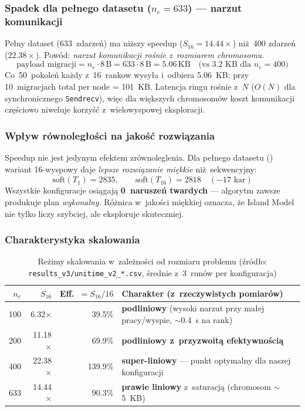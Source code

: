 \documentclass{common/sprawozdanie-agh}
\begin{document}
\subsubsection*{Spadek dla pełnego datasetu ($n_e=633$) --- narzut komunikacji}

Pełny dataset  (633~zdarzeń) ma niższy speedup ($S_{16}=14.44\times$) niż~400 zdarzeń ($22.38\times$). Powód: \emph{narzut komunikacji rośnie z~rozmiarem chromosomu}.
\[
\text{payload migracji} = n_e \cdot 8\,\text{B} = 633 \cdot 8\,\text{B} = 5.06\,\text{KB}\quad
\text{(vs 3.2 KB dla }n_e{=}400\text{)}
\]
Co~50~pokoleń każdy z~16~rankow wysyła i~odbiera 5.06~KB; przy 10~migracjach total per node = 101~KB. Latencja ringu rośnie z~$N$ ($O(N)$ dla synchronicznego \texttt{Sendrecv}), więc dla większych chromosomów koszt komunikacji częściowo niweluje korzyść z~wielowyspowej eksploracji.

\subsubsection*{Wpływ równoległości na jakość rozwiązania}

Speedup nie jest jedynym efektem zrównoleglenia. Dla pełnego datasetu () wariant 16-wyspowy daje \emph{lepsze rozwiązanie miękkie} niż~sekwencyjny:
\[
\overline{\text{soft}}(T_1) = 2835,\qquad \overline{\text{soft}}(T_{16}) = 2818
\quad (-17 \text{ kar})
\]
Wszystkie konfiguracje osiągają \textbf{0~naruszeń twardych} --- algorytm zawsze produkuje plan \emph{wykonalny}. Różnica w~jakości miękkiej oznacza, że Island Model nie tylko liczy szybciej, ale eksploruje skuteczniej.

\subsubsection*{Charakterystyka skalowania}

\begin{table}[H]
\centering\small
\renewcommand{\arraystretch}{1.2}
\begin{tabularx}{\textwidth}{rrrX}
\toprule
\textbf{$n_e$} & \textbf{$S_{16}$} & \textbf{Eff.~$=S_{16}/16$} & \textbf{Charakter (z~rzeczywistych pomiarów)} \\
\midrule
100  &  6.32$\times$ & 39.5\%  & \textbf{podliniowy} (wysoki narzut przy małej pracy/wyspie, $\sim$0.4~s na rank) \\
200  & 11.18$\times$ & 69.9\%  & \textbf{podliniowy z~przyzwoitą efektywnością} \\
400  & 22.38$\times$ & 139.9\% & \textbf{super-liniowy} --- punkt optymalny dla naszej konfiguracji \\
633  & 14.44$\times$ & 90.3\%  & \textbf{prawie liniowy} z~saturacją (chromosom $\sim$5~KB) \\
\bottomrule
\end{tabularx}
\caption{Reżimy skalowania w~zależności od rozmiaru problemu (źródło: \texttt{results\_v3/unitime\_v2\_*.csv}, średnie z~3~runów per konfiguracja)}
\label{tab:scaling-regime}
\end{table}
\end{document}
